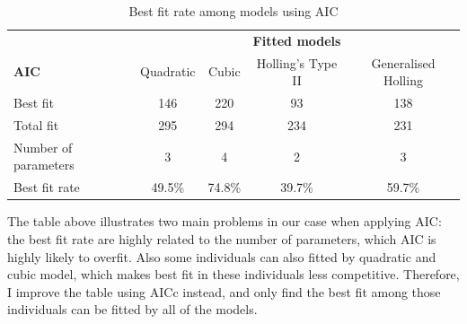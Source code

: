 \documentclass{article}[11pt,a4,twosided,doublespacing,titlepagenumber=on,numbers=endperiod]
\begin{document}
\begin{table}[H]
\centering 
\begin{tabular}{l c c c c}
\toprule %
& \multicolumn{4}{c}{\textbf{Fitted models}} \\
\cmidrule(l){2-5}
\textbf{AIC} & Quadratic & Cubic & Holling's Type II & Generalised Holling\\ %
\midrule %
Best fit & 146 & 220 & 93 & 138\\ %
Total fit  & 295 & 294 & 234 & 231\\ %
Number of parameters & 3 & 4 & 2 & 3\\ %
\midrule %
\midrule %
Best fit rate & 49.5\% & 74.8\% & 39.7\% & 59.7\% \\ %
\bottomrule %
\end{tabular}
\caption{Best fit rate among models using AIC} %
\label{tab:template} %
\end{table}
\noindent
The table above illustrates two main problems in our case when applying AIC: the best fit rate are highly related to the number of parameters, which AIC is highly likely to overfit. Also some individuals can also fitted by quadratic and cubic model, which makes best fit in these individuals less competitive. Therefore, I improve the table using AICc instead, and only find the best fit among those individuals can be fitted by all of the models.
\end{document}

